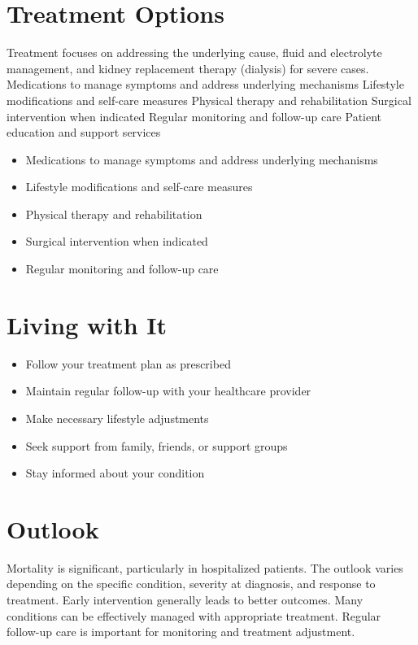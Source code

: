\section{Treatment Options}
Treatment focuses on addressing the underlying cause, fluid and electrolyte management, and kidney replacement therapy (dialysis) for severe cases. Medications to manage symptoms and address underlying mechanisms Lifestyle modifications and self-care measures Physical therapy and rehabilitation Surgical intervention when indicated Regular monitoring and follow-up care Patient education and support services

\begin{itemize}[noitemsep]
  \item Medications to manage symptoms and address underlying mechanisms
  \item Lifestyle modifications and self-care measures
  \item Physical therapy and rehabilitation
  \item Surgical intervention when indicated
  \item Regular monitoring and follow-up care
\end{itemize}
\section{Living with It}
\begin{itemize}[noitemsep]
  \item Follow your treatment plan as prescribed
  \item Maintain regular follow-up with your healthcare provider
  \item Make necessary lifestyle adjustments
  \item Seek support from family, friends, or support groups
  \item Stay informed about your condition
\end{itemize}
\section{Outlook}
Mortality is significant, particularly in hospitalized patients. The outlook varies depending on the specific condition, severity at diagnosis, and response to treatment. Early intervention generally leads to better outcomes. Many conditions can be effectively managed with appropriate treatment. Regular follow-up care is important for monitoring and treatment adjustment.
